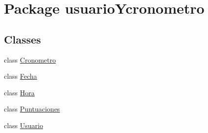 \hypertarget{namespaceusuario_ycronometro}{}\section{Package usuario\+Ycronometro}
\label{namespaceusuario_ycronometro}
\subsection*{Classes}
\begin{DoxyCompactItemize}
\item 
class \mbox{\hyperlink{classusuario_ycronometro_1_1_cronometro}{Cronometro}}
\item 
class \mbox{\hyperlink{classusuario_ycronometro_1_1_fecha}{Fecha}}
\item 
class \mbox{\hyperlink{classusuario_ycronometro_1_1_hora}{Hora}}
\item 
class \mbox{\hyperlink{classusuario_ycronometro_1_1_puntuaciones}{Puntuaciones}}
\item 
class \mbox{\hyperlink{classusuario_ycronometro_1_1_usuario}{Usuario}}
\end{DoxyCompactItemize}
